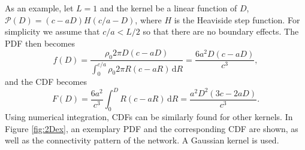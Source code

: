 As an example, let $L = 1$ and the kernel be a linear function of $D$, $\mathcal{P}(D) = (c - aD) H(c/a-D)$, where $H\label{eq:Heaviside}$ is the Heaviside step function. For simplicity we assume that $c/a < L/2$ so that there are no boundary effects. The PDF then becomes
\begin{equation}
f(D) = \frac{\rho_0 2\pi D (c-aD)}{\int_0^{c/a} \rho_0 2\pi R (c-aR) \, \mathrm{d}R}
= \frac{6a^2D(c-aD)}{c^3},
\end{equation}
and the CDF becomes 
\begin{equation}
F(D) = \frac{6a^2}{c^3} \int_0^D R(c-aR) \, \mathrm{d}R = \frac{a^2 D^2 (3c-2aD)}{c^3}.
\end{equation}
Using numerical integration, CDFs can be similarly found for other kernels. In Figure \ref{fig:2Dex}, an exemplary PDF and the corresponding CDF are shown, as well as the connectivity pattern of the network. A Gaussian kernel is used. 

